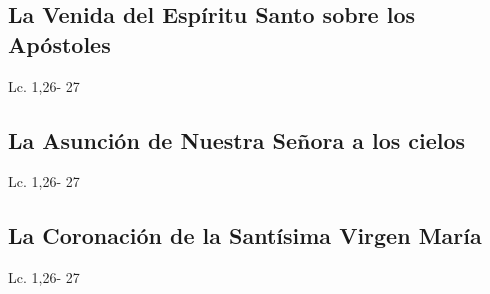 \documentclass[a4paper,11pt,sans]{article}
\begin{document}
    \subsection*{\hfil La Venida del Espíritu Santo sobre los Apóstoles \hfil}
      \begin{multicols}{2}

      \columnbreak
                           
      \end{multicols}         
      \begin{center}
        Lc. 1,26- 27           
      \end{center}
    \subsection*{\hfil La Asunción de Nuestra Señora a los cielos \hfil}
      \begin{multicols}{2}

      \columnbreak
                           
      \end{multicols}         
      \begin{center}
        Lc. 1,26- 27           
      \end{center}
    \subsection*{\hfil La Coronación de la Santísima Virgen María \hfil}
      \begin{multicols}{2}

      \columnbreak
                           
      \end{multicols}         
      \begin{center}
        Lc. 1,26- 27           
      \end{center}
\end{document}
